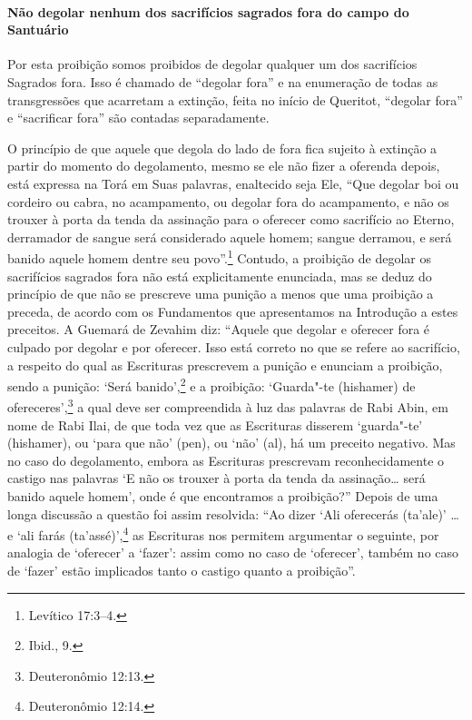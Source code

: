 \begin{multicols}{2}
\paragraph{Não degolar nenhum dos sacrifícios sagrados fora do campo do Santuário}

Por esta proibição somos proibidos de degolar qualquer um dos
sacrifícios Sagrados fora. Isso é chamado de ``degolar fora'' e na
enumeração de todas as transgressões que acarretam a extinção, feita no
início de Queritot\starr, ``degolar fora'' e ``sacrificar fora'' são contadas
separadamente.

O princípio de que aquele que degola do lado de fora fica sujeito à
extinção a partir do momento do degolamento, mesmo se ele não fizer a
oferenda depois, está expressa na Torá\starr{} em Suas palavras, enaltecido
seja Ele, ``Que degolar boi ou cordeiro ou cabra, no acampamento, ou
degolar fora do acampamento, e não os trouxer à porta da tenda da
assinação para o oferecer como sacrifício ao Eterno, derramador de
sangue será considerado aquele homem; sangue derramou, e será banido
aquele homem dentre seu povo''.\footnote{Levítico 17:3--4.} Contudo, a proibição
de degolar os sacrifícios sagrados fora não está explicitamente
enunciada, mas se deduz do princípio de que não se prescreve uma
punição a menos que uma proibição a preceda, de acordo com os
Fundamentos que apresentamos na Introdução a estes preceitos. A Guemará\starr{}
de Zevahim\starr{} diz: ``Aquele que degolar e oferecer fora é culpado por
degolar e por oferecer. Isso está correto no que se refere ao
sacrifício, a respeito do qual as Escrituras prescrevem a punição e enunciam a proibição, sendo a punição: `Será banido',\footnote{Ibid., 9.}
e a proibição: `Guarda"-te (hishamer\starr) de ofereceres',\footnote{Deuteronômio
12:13.} a qual deve ser compreendida à luz das palavras de Rabi Abin\starr, em
nome de Rabi Ilai\starr, de que toda vez que as Escrituras disserem
`guarda"-te' (hishamer\starr), ou `para que não' (pen), ou `não' (al), há um
preceito negativo. Mas no caso do degolamento, embora as Escrituras
prescrevam reconhecidamente o castigo nas palavras `E não os trouxer à
porta da tenda da assinação\ldots{} será banido aquele homem', onde é que
encontramos a proibição?'' Depois de uma longa discussão a questão foi
assim resolvida: ``Ao dizer `Ali oferecerás (ta'ale\starr)' \ldots{} e `ali farás
(ta'assé\starr)',\footnote{Deuteronômio 12:14.} as Escrituras nos permitem argumentar o
seguinte, por analogia de `oferecer' a `fazer': assim como no caso de
`oferecer', também no caso de `fazer' estão implicados tanto o castigo
quanto a proibição''.


\end{multicols}
